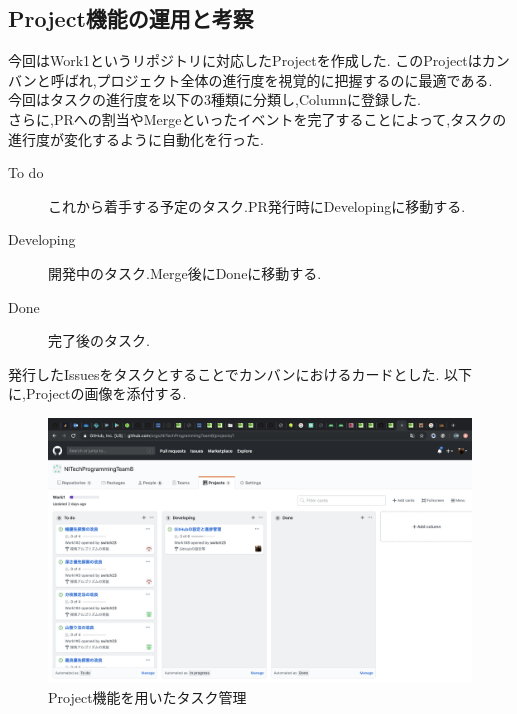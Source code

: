 ﻿\documentclass[uplatex,12pt]{jsarticle}
\begin{document}
\subsection{Project機能の運用と考察}
今回はWork1というリポジトリに対応したProjectを作成した.
このProjectはカンバンと呼ばれ,プロジェクト全体の進行度を視覚的に把握するのに最適である. \\
今回はタスクの進行度を以下の3種類に分類し,Columnに登録した. \\
さらに,PRへの割当やMergeといったイベントを完了することによって,タスクの進行度が変化するように自動化を行った.
\begin{description}
  \item[To do] これから着手する予定のタスク.PR発行時にDevelopingに移動する.
  \item[Developing] 開発中のタスク.Merge後にDoneに移動する.
  \item[Done] 完了後のタスク.
\end{description}
発行したIssuesをタスクとすることでカンバンにおけるカードとした.
以下に,Projectの画像を添付する.

\begin{figure}[!hbt]
  \centering
  \includegraphics[scale=0.25]{git_image/project_image.png}
  \caption{Project機能を用いたタスク管理}
\end{figure}

\newpage
\end{document}

